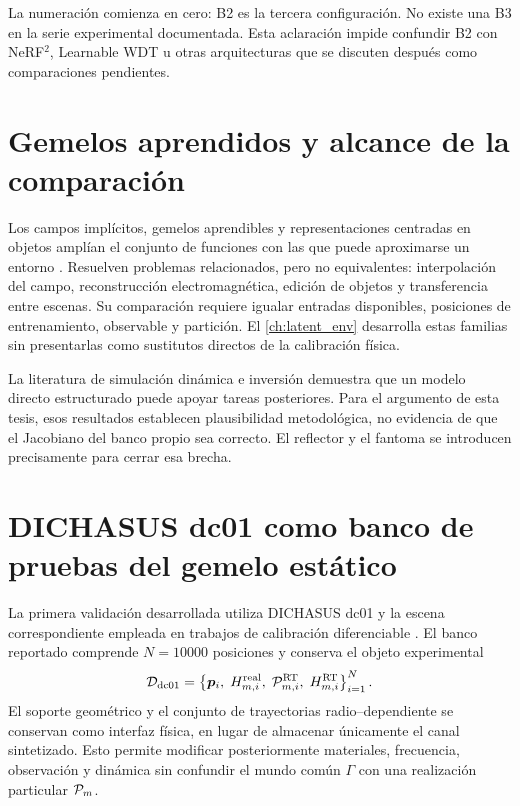 La numeración comienza en cero: B2 es la tercera configuración. No existe una B3
en la serie experimental documentada. Esta aclaración impide confundir B2 con
NeRF$^2$, Learnable WDT u otras arquitecturas que se discuten después como
comparaciones pendientes.

\section{Gemelos aprendidos y alcance de la comparación}

Los campos implícitos, gemelos aprendibles y representaciones centradas en objetos
amplían el conjunto de funciones con las que puede aproximarse un entorno
\citep{Zhao2023NeRF2,Jiang2025LearnableWDT,Chen2025RFScape,Zhang2026RadTwin}.
Resuelven problemas relacionados, pero no equivalentes: interpolación del campo,
reconstrucción electromagnética, edición de objetos y transferencia entre escenas.
Su comparación requiere igualar entradas disponibles, posiciones de entrenamiento,
observable y partición. El \cref{ch:latent_env} desarrolla estas familias sin
presentarlas como sustitutos directos de la calibración física.

La literatura de simulación dinámica e inversión
\citep{Zheng2026WaveVerse,Han2026RayLoc,Chen2026RFDT,Chen2025InverTwin}
demuestra que un modelo directo estructurado puede apoyar tareas posteriores.
Para el argumento de esta tesis, esos resultados establecen plausibilidad
metodológica, no evidencia de que el Jacobiano del banco propio sea correcto.
El reflector y el fantoma se introducen precisamente para cerrar esa brecha.

\section{DICHASUS dc01 como banco de pruebas del gemelo estático}

La primera validación desarrollada utiliza DICHASUS dc01 y la escena correspondiente empleada en trabajos de calibración diferenciable \citep{Euchner2023DICHASUSdcxx,Hoydis2024DiffRT}. El banco reportado comprende $N=10000$ posiciones y conserva el objeto experimental
\begin{equation}
\mathcal D_{\rm dc01}
=\left\{
\bm{p}_i,\;H_{m,i}^{\rm real},\;\mathcal{P}_{m,i}^{\rm RT},\;H_{m,i}^{\rm RT}
\right\}_{i=1}^{N}.
\label{eq:dc01_dataset}
\end{equation}
El soporte geométrico y el conjunto de trayectorias radio--dependiente se conservan como interfaz física, en lugar de almacenar únicamente el canal sintetizado. Esto permite modificar posteriormente materiales, frecuencia, observación y dinámica sin confundir el mundo común $\Gamma$ con una realización particular $\mathcal{P}_m$.

